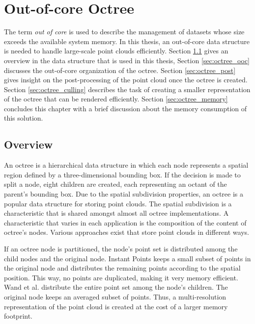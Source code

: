 \chapter{Out-of-core Octree}
\label{chap:octree}

The term \textit{out of core} is used to describe the management of datasets whose size exceeds the available system memory. In this thesis, an out-of-core data structure is needed to handle large-scale point clouds efficiently. Section \ref{sec:octree_overview} gives an overview in the data structure that is used in this thesis, Section \ref{sec:octree_ooc} discusses the out-of-core organization of the octree. Section \ref{sec:octree_post} gives insight on the post-processing of the point cloud once the octree is created. Section \ref{sec:octree_culling} describes the task of creating a smaller representation of the octree that can be rendered efficiently. Section \ref{sec:octree_memory} concludes this chapter with a brief discussion about the memory consumption of this solution. 


\section{Overview}
\label{sec:octree_overview}

An octree is a hierarchical data structure in which each node represents a spatial region defined by a three-dimensional bounding box. If the decision is made to split a node, eight children are created, each representing an octant of the parent's bounding box. Due to the spatial subdivision properties, an octree is a popular data structure for storing point clouds. The spatial subdivision is a characteristic that is shared amongst almost all octree implementations. A characteristic that varies in each application is the composition of the content of octree's nodes. Various approaches exist that store point clouds in different ways. 

If an octree node is partitioned, the node's point set is distributed among the child nodes and the original node. 
Instant Points \cite{wimmer2006instant} keeps a small subset of points in the original node and distributes the remaining points according to the spatial position. This way, no points are duplicated, making it very memory efficient. 
Wand et al. \cite{wand2007interactive} distribute the entire point set among the node's children. The original node keeps an averaged subset of points. Thus, a multi-resolution representation of the point cloud is created at the cost of a larger memory footprint. 

